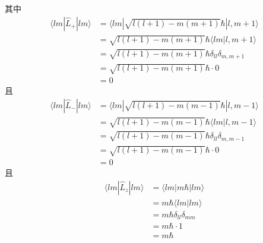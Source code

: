 其中
\begin{equation}
    \begin{aligned}
        \langle lm|\hat{L}_+|lm\rangle &=\langle lm|\sqrt{l\left( l+1 \right) -m\left( m+1 \right)}\hbar |l,m+1\rangle 
\\
&=\sqrt{l\left( l+1 \right) -m\left( m+1 \right)}\hbar \langle lm|l,m+1\rangle 
\\
&=\sqrt{l\left( l+1 \right) -m\left( m+1 \right)}\hbar \delta _{ll}\delta _{m,m+1}
\\
&=\sqrt{l\left( l+1 \right) -m\left( m+1 \right)}\hbar \cdot 0
\\
&=0
    \end{aligned}
\end{equation}
且
\begin{equation}
    \begin{aligned}
        \langle lm|\hat{L}_-|lm\rangle &=\langle lm|\sqrt{l\left( l+1 \right) -m\left( m-1 \right)}\hbar |l,m-1\rangle 
\\
&=\sqrt{l\left( l+1 \right) -m\left( m-1 \right)}\hbar \langle lm|l,m-1\rangle 
\\
&=\sqrt{l\left( l+1 \right) -m\left( m-1 \right)}\hbar \delta _{ll}\delta _{m,m-1}
\\
&=\sqrt{l\left( l+1 \right) -m\left( m-1 \right)}\hbar \cdot 0
\\
&=0
    \end{aligned}
\end{equation}
且
\begin{equation}
    \begin{aligned}
        \langle lm|\hat{L}_z|lm\rangle &=\langle lm|m\hbar |lm\rangle 
\\
&=m\hbar \langle lm|lm\rangle 
\\
&=m\hbar \delta _{ll}\delta _{mm}
\\
&=m\hbar \cdot 1
\\
&=m\hbar 
    \end{aligned}
\end{equation}

